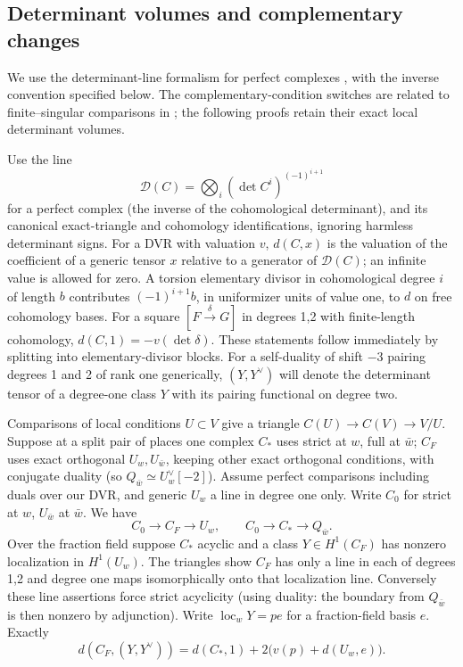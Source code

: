 \subsection{Determinant volumes and complementary changes}

We use the determinant-line formalism for perfect complexes
\cite{KnudsenMumford76}, with the inverse convention specified below.
The complementary-condition switches are related to finite--singular
comparisons in \cite[Section~1.2]{MazurRubin04}; the following proofs
retain their exact local determinant volumes.

Use the line
\[
 \mathcal D(C)=\bigotimes_i(\det C^i)^{(-1)^{i+1}}
\]
for a perfect complex (the inverse of the cohomological determinant), and its canonical exact-triangle and cohomology identifications, ignoring harmless determinant signs. For a DVR with valuation \(v\), \(d(C,x)\) is the valuation of the coefficient of a generic tensor \(x\) relative to a generator of \(\mathcal D(C)\); an infinite value is allowed for zero. A torsion elementary divisor in cohomological degree \(i\) of length \(b\) contributes \((-1)^{i+1}b\), in uniformizer units of value one, to \(d\) on free cohomology bases. For a square \([F\xrightarrow{\delta}G]\) in degrees 1,2 with finite-length cohomology, \(d(C,1)=-v(\det\delta)\). These statements follow immediately by splitting into elementary-divisor blocks. For a self-duality of shift \(-3\) pairing degrees 1 and 2 of rank one generically, \((Y,Y^\vee)\) will denote the determinant tensor of a degree-one class \(Y\) with its pairing functional on degree two.

\begin{lemma}\label{lem:foundations-D}
Comparisons of local conditions \(U\subset V\) give a triangle \(C(U)\to C(V)\to V/U\). Suppose at a split pair of places one complex \(C_*\) uses strict at \(w\), full at \(\bar w\); \(C_F\) uses exact orthogonal \(U_w,U_{\bar w}\), keeping other exact orthogonal conditions, with conjugate duality (so \(Q_{\bar w}\simeq U_w^\vee[-2]\)). Assume perfect comparisons including duals over our DVR, and generic \(U_w\) a line in degree one only. Write \(C_0\) for strict at \(w\), \(U_{\bar w}\) at \(\bar w\). We have
\[
 C_0\to C_F\to U_w,\qquad C_0\to C_*\to Q_{\bar w}.
\]
Over the fraction field suppose \(C_*\) acyclic and a class \(Y\in H^1(C_F)\) has nonzero localization in \(H^1(U_w)\). The triangles show \(C_F\) has only a line in each of degrees 1,2 and degree one maps isomorphically onto that localization line. Conversely these line assertions force strict acyclicity (using duality: the boundary from \(Q_{\bar w}\) is then nonzero by adjunction). Write \(\operatorname{loc}_wY=p e\) for a fraction-field basis \(e\). Exactly
\[
 d(C_F,(Y,Y^\vee))=d(C_*,1)+2\big(v(p)+d(U_w,e)\big).       \tag{D}\label{eq:D}
\]
\end{lemma}

